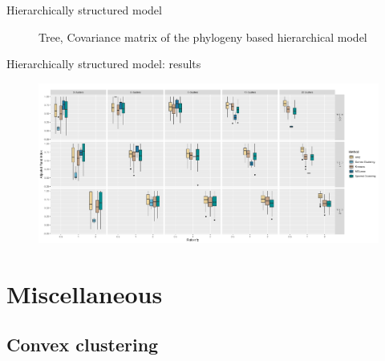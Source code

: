 \documentclass[11pt]{beamer}
\begin{document}
\begin{frame}{Hierarchically structured model}
\begin{figure}[H]
\begin{subfigure}[b]{0.4\textwidth}
												\end{subfigure}
												\caption{Tree, Covariance matrix of the phylogeny based hierarchical model}
												\label{fig:hierarchical-model}
											\end{figure}
										\end{frame}
										
										\begin{frame}{Hierarchically structured model: results}
											\begin{figure}
												\includegraphics[scale=0.28]{images/tree-model-perf-rand.png}
											\end{figure}
										\end{frame}
										
										
										\section{Miscellaneous}
										\subsection{Convex clustering}
										
\end{document}

